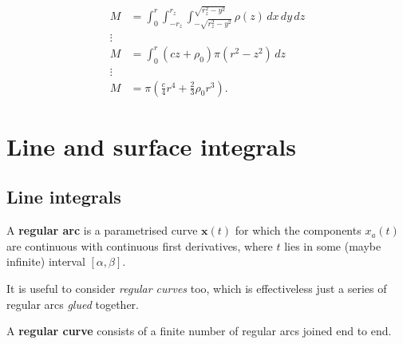 \begin{solution}
    \begin{align*}
        M &= \int_0^r \int_{-r_z}^{r_z} 
        \int_{-\sqrt{r_z^2 - y^2}}^{\sqrt{r_z^2 - y^2}} \rho(z) \,dx\,dy\,dz \\
        \vdots \\
        M &= \int_0^r (cz + \rho_0) \pi (r^2 - z^2) \, dz \\
        \vdots \\
        M &= \pi \left( \frac c4 r^4 + \frac23 \rho_0 r^3 \right).
    \end{align*}
\end{solution}

\chapter{Line and surface integrals}
\section{Line integrals}

\begin{definition}
    A \textbf{regular arc} is a parametrised curve $\bm x(t)$ for which
    the components $x_a(t)$ are continuous with continuous first derivatives,
    where $t$ lies in some (maybe infinite) interval $[\alpha, \beta]$.
\end{definition}

It is useful to consider \emph{regular curves} too, 
which is effectiveless just a series of regular arcs \emph{glued}
together.

\begin{definition}
    A \textbf{regular curve} consists of a finite number of regular arcs
    joined end to end.
\end{definition}
